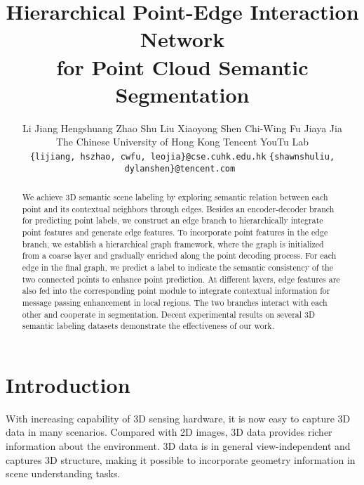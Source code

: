 \documentclass[10pt,twocolumn,letterpaper]{article}
\begin{document}
\title{Hierarchical Point-Edge Interaction Network \\ for Point Cloud Semantic Segmentation}

\author{Li Jiang \quad Hengshuang Zhao \quad Shu Liu \quad Xiaoyong Shen \quad Chi-Wing Fu \quad Jiaya Jia\\
	The Chinese University of Hong Kong \quad Tencent YouTu Lab\\
	{\tt\small \{lijiang, hszhao, cwfu, leojia\}@cse.cuhk.edu.hk} \quad \tt\small \{shawnshuliu, dylanshen\}@tencent.com
}

\maketitle




\begin{abstract}
We achieve 3D semantic scene labeling by exploring semantic relation between each point and its contextual neighbors through edges. Besides an encoder-decoder branch for predicting point labels, we construct an edge branch to hierarchically integrate point features and generate edge features. To incorporate point features in the edge branch, we establish a hierarchical graph framework, where the graph is initialized from a coarse layer and gradually enriched along the point decoding process. For each edge in the final graph, we predict a label to indicate the semantic consistency of the two connected points to enhance point prediction. At different layers, edge features are also fed into the corresponding point module to integrate contextual information for message passing enhancement in local regions. The two branches interact with each other and cooperate in segmentation. Decent experimental results on several 3D semantic labeling datasets demonstrate the effectiveness of our work. 
\end{abstract}
\vspace{-2mm}

\section{Introduction}
With increasing capability of 3D sensing hardware, it is now easy to capture 3D data in many scenarios. Compared with 2D images, 3D data provides richer information about the environment. 3D data is in general view-independent and captures 3D structure, making it possible to incorporate geometry information in scene understanding tasks.
\end{document}

